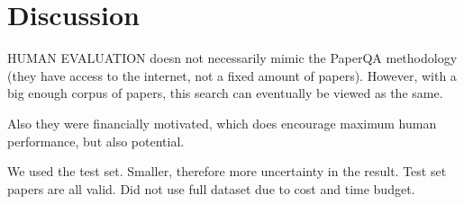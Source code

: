 \section{Discussion}
\label{sec:discussion}

HUMAN EVALUATION doesn not necessarily mimic the PaperQA methodology (they have access to the internet, not a fixed amount of papers). However, with a big enough corpus of papers, this search can eventually be viewed as the same. 

Also they were financially motivated, which does encourage maximum human performance, but also potential. 

We used the test set. Smaller, therefore more uncertainty in the result. Test set papers are all valid. Did not use full dataset due to cost and time budget. 